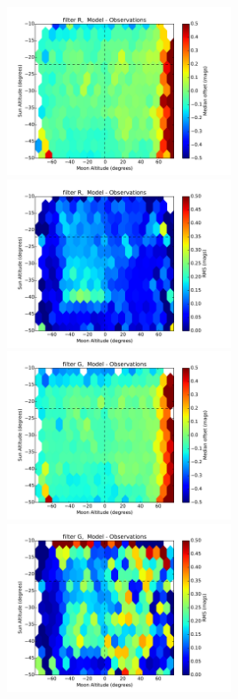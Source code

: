 \documentclass[]{spie}
\begin{document}
\begin{figure}[ht]
  \begin{center}
  \includegraphics[height=5cm]{plots/zenithMedian_R_.pdf}\includegraphics[height=5cm]{plots/zenithRMS_R_.pdf}
  \includegraphics[height=5cm]{plots/zenithMedian_G_.pdf}\includegraphics[height=5cm]{plots/zenithRMS_G_.pdf}

\end{center}
\end{figure}
\end{document}
